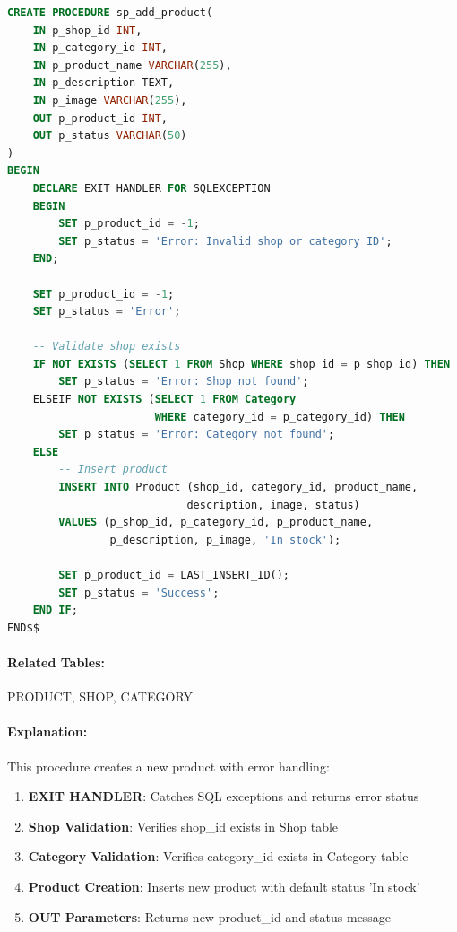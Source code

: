 \begin{lstlisting}[language=SQL, caption=Procedure: sp\_add\_product, label=lst:sp_add_product]
CREATE PROCEDURE sp_add_product(
    IN p_shop_id INT,
    IN p_category_id INT,
    IN p_product_name VARCHAR(255),
    IN p_description TEXT,
    IN p_image VARCHAR(255),
    OUT p_product_id INT,
    OUT p_status VARCHAR(50)
)
BEGIN
    DECLARE EXIT HANDLER FOR SQLEXCEPTION
    BEGIN
        SET p_product_id = -1;
        SET p_status = 'Error: Invalid shop or category ID';
    END;
    
    SET p_product_id = -1;
    SET p_status = 'Error';
    
    -- Validate shop exists
    IF NOT EXISTS (SELECT 1 FROM Shop WHERE shop_id = p_shop_id) THEN
        SET p_status = 'Error: Shop not found';
    ELSEIF NOT EXISTS (SELECT 1 FROM Category 
                       WHERE category_id = p_category_id) THEN
        SET p_status = 'Error: Category not found';
    ELSE
        -- Insert product
        INSERT INTO Product (shop_id, category_id, product_name, 
                            description, image, status)
        VALUES (p_shop_id, p_category_id, p_product_name, 
                p_description, p_image, 'In stock');
        
        SET p_product_id = LAST_INSERT_ID();
        SET p_status = 'Success';
    END IF;
END$$
\end{lstlisting}

\paragraph{Related Tables:} PRODUCT, SHOP, CATEGORY

\paragraph{Explanation:}
This procedure creates a new product with error handling:
\begin{enumerate}
    \item \textbf{EXIT HANDLER}: Catches SQL exceptions and returns error status
    \item \textbf{Shop Validation}: Verifies shop\_id exists in Shop table
    \item \textbf{Category Validation}: Verifies category\_id exists in Category table
    \item \textbf{Product Creation}: Inserts new product with default status 'In stock'
    \item \textbf{OUT Parameters}: Returns new product\_id and status message
\end{enumerate}

